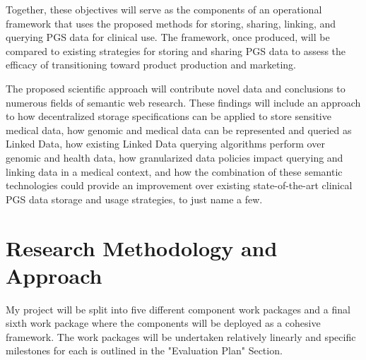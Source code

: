 \documentclass[runningheads]{llncs}
\begin{document}
Together, these objectives will serve as the components of an operational framework that uses the proposed methods for storing, sharing, linking, and querying PGS data for clinical use. The framework, once produced, will be compared to existing strategies for storing and sharing PGS data to assess the efficacy of transitioning toward product production and marketing.

The proposed scientific approach will contribute novel data and conclusions to numerous fields of semantic web research. These findings will include an approach to how decentralized storage specifications can be applied to store sensitive medical data, how genomic and medical data can be represented and queried as Linked Data, how existing Linked Data querying algorithms perform over genomic and health data, how granularized data policies impact querying and linking data in a medical context, and how the combination of these semantic technologies could provide an improvement over existing state-of-the-art clinical PGS data storage and usage strategies, to just name a few.


\section{Research Methodology and Approach}

My project will be split into five different component work packages and a final sixth work package where the components will be deployed as a cohesive framework. 
The work packages will be undertaken relatively linearly and specific milestones for each is outlined in the "Evaluation Plan" Section.
\end{document}
